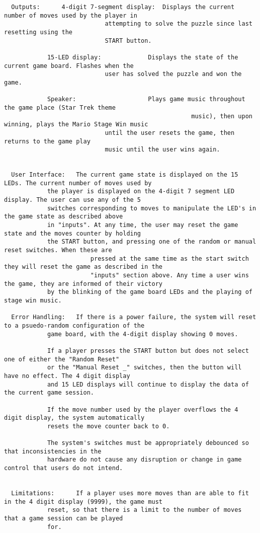 \documentclass[12 pt]{article}
\begin{document}
\begin{verbatim}
  Outputs:		4-digit 7-segment display:  Displays the current number of moves used by the player in
						    attempting to solve the puzzle since last resetting using the 
						    START button.

			15-LED display:             Displays the state of the current game board. Flashes when the 
						    user has solved the puzzle and won the game.

			Speaker:                    Plays game music throughout the game place (Star Trek theme 
                                                    music), then upon winning, plays the Mario Stage Win music 
						    until the user resets the game, then returns to the game play
						    music until the user wins again. 
			

  User Interface: 	The current game state is displayed on the 15 LEDs. The current number of moves used by 
			the player is displayed on the 4-digit 7 segment LED display. The user can use any of the 5
			switches corresponding to moves to manipulate the LED's in the game state as described above
			in "inputs". At any time, the user may reset the game state and the moves counter by holding  
			the START button, and pressing one of the random or manual reset switches. When these are 
                        pressed at the same time as the start switch they will reset the game as described in the 
                        "inputs" section above. Any time a user wins the game, they are informed of their victory 
			by the blinking of the game board LEDs and the playing of stage win music.

  Error Handling:	If there is a power failure, the system will reset to a psuedo-random configuration of the
			game board, with the 4-digit display showing 0 moves.

			If a player presses the START button but does not select one of either the "Random Reset"
			or the "Manual Reset _" switches, then the button will have no effect. The 4 digit display
			and 15 LED displays will continue to display the data of the current game session.

			If the move number used by the player overflows the 4 digit display, the system automatically 
			resets the move counter back to 0.

			The system's switches must be appropriately debounced so that inconsistencies in the 
			hardware do not cause any disruption or change in game control that users do not intend.


  Limitations:		If a player uses more moves than are able to fit in the 4 digit display (9999), the game must 
			reset, so that there is a limit to the number of moves that a game session can be played 
			for.

\end{verbatim}
\end{document}
